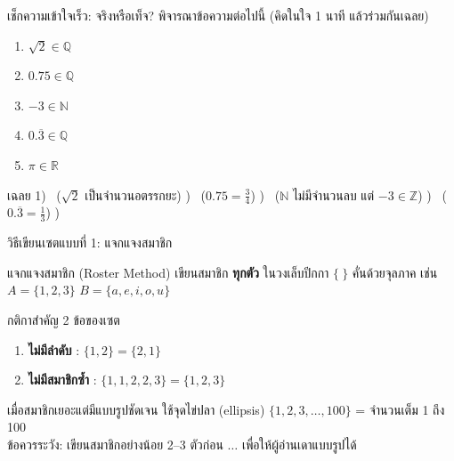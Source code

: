 \begin{frame}{เช็กความเข้าใจเร็ว: จริงหรือเท็จ?}
  พิจารณาข้อความต่อไปนี้ (คิดในใจ 1 นาที แล้วร่วมกันเฉลย)
  \begin{enumerate}
    \item $\sqrt{2} \in \mathbb{Q}$
    \item $0.75 \in \mathbb{Q}$
    \item $-3 \in \mathbb{N}$
    \item $0.\overline{3} \in \mathbb{Q}$
    \item $\pi \in \mathbb{R}$
  \end{enumerate}
  \pause
  \begin{exampleblock}{เฉลย}
    \footnotesize
    1) \FF\ ($\sqrt{2}$ เป็นจำนวนอตรรกยะ) ) \TT\ ($0.75 = \tfrac{3}{4}$) ) \FF\ ($\mathbb{N}$ ไม่มีจำนวนลบ แต่ $-3 \in \mathbb{Z}$) ) \TT\ ($0.\overline{3} = \tfrac{1}{3}$) ) \TT
  \end{exampleblock}
\end{frame}

\begin{frame}{วิธีเขียนเซตแบบที่ 1: แจกแจงสมาชิก}
  \begin{block}{แจกแจงสมาชิก (Roster Method)}
    เขียนสมาชิก \textbf{ทุกตัว} ในวงเล็บปีกกา $\{\ \}$ คั่นด้วยจุลภาค เช่น
    $A = \{1, 2, 3\}$ \quad $B = \{a, e, i, o, u\}$
  \end{block}
  \vspace{0.3em}
  กติกาสำคัญ 2 ข้อของเซต
  \begin{enumerate}
    \item \textbf{ไม่มีลำดับ} : $\{1, 2\} = \{2, 1\}$
    \item \textbf{ไม่มีสมาชิกซ้ำ} : $\{1, 1, 2, 2, 3\} = \{1, 2, 3\}$
  \end{enumerate}
  \vspace{0.3em}
  \begin{exampleblock}{เมื่อสมาชิกเยอะแต่มีแบบรูปชัดเจน ใช้จุดไข่ปลา (ellipsis)}
    $\{1, 2, 3, \ldots, 100\}$ = จำนวนเต็ม 1 ถึง 100 \\
    \footnotesize ข้อควรระวัง: เขียนสมาชิกอย่างน้อย 2--3 ตัวก่อน $\ldots$ เพื่อให้ผู้อ่านเดาแบบรูปได้
  \end{exampleblock}
\end{frame}

